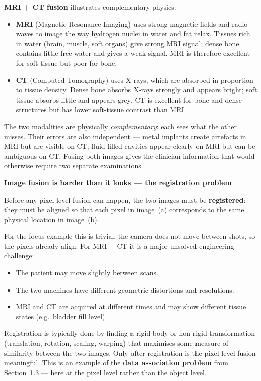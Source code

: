 \documentclass[12pt, a4paper]{article}
\begin{document}
\textbf{MRI + CT fusion} illustrates complementary physics:
\begin{itemize}[leftmargin=1.4em, itemsep=2pt]
  \item \textbf{MRI} (Magnetic Resonance Imaging) uses strong magnetic
    fields and radio waves to image the way hydrogen nuclei in water and fat
    relax.
    Tissues rich in water (brain, muscle, soft organs) give strong MRI signal;
    dense bone contains little free water and gives a weak signal.
    MRI is therefore excellent for soft tissue but poor for bone.
  \item \textbf{CT} (Computed Tomography) uses X-rays, which are absorbed
    in proportion to tissue density.
    Dense bone absorbs X-rays strongly and appears bright; soft tissue absorbs
    little and appears grey.
    CT is excellent for bone and dense structures but has lower soft-tissue
    contrast than MRI.
\end{itemize}
The two modalities are physically \emph{complementary}: each sees what the
other misses.
Their errors are also independent --- metal implants create artefacts in MRI
but are visible on CT; fluid-filled cavities appear clearly on MRI but can
be ambiguous on CT.
Fusing both images gives the clinician information that would otherwise require
two separate examinations.

\begin{warnbox}
  \textbf{Image fusion is harder than it looks --- the registration problem}

  Before any pixel-level fusion can happen, the two images must be
  \textbf{registered}: they must be aligned so that each pixel in image~(a)
  corresponds to the same physical location in image~(b).

  For the focus example this is trivial: the camera does not move between
  shots, so the pixels already align.
  For MRI + CT it is a major unsolved engineering challenge:
  \begin{itemize}[leftmargin=1.2em, itemsep=2pt]
    \item The patient may move slightly between scans.
    \item The two machines have different geometric distortions and
      resolutions.
    \item MRI and CT are acquired at different times and may show
      different tissue states (e.g.\ bladder fill level).
  \end{itemize}
  Registration is typically done by finding a rigid-body or non-rigid
  transformation (translation, rotation, scaling, warping) that maximises
  some measure of similarity between the two images.
  Only after registration is the pixel-level fusion meaningful.
  This is an example of the \textbf{data association problem} from
  Section~1.3 --- here at the pixel level rather than the object level.
\end{warnbox}
\end{document}
